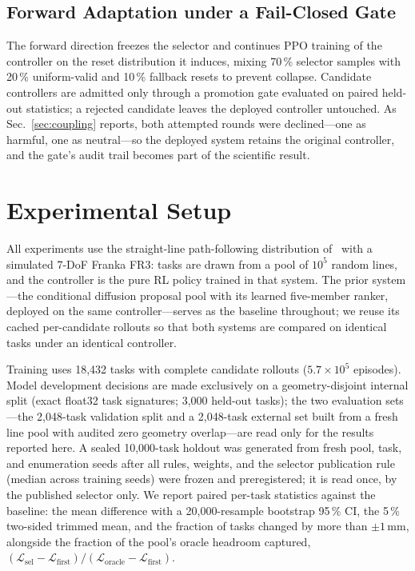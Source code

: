 \documentclass{svproc}
\begin{document}
\subsection{Forward Adaptation under a Fail-Closed Gate}
\label{sec:method-forward}
The forward direction freezes the selector and continues PPO training of the
controller on the reset distribution it induces, mixing 70\,\% selector
samples with 20\,\% uniform-valid and 10\,\% fallback resets to prevent
collapse. Candidate controllers are admitted only through a promotion gate
evaluated on paired held-out statistics; a rejected candidate leaves the
deployed controller untouched. As Sec.~\ref{sec:coupling} reports, both
attempted rounds were declined---one as harmful, one as neutral---so the
deployed system retains the original controller, and the gate's audit trail
becomes part of the scientific result.

\section{Experimental Setup}
\label{sec:setup}
All experiments use the straight-line path-following distribution
of~\cite{yuan2026extreme} with a simulated 7-DoF Franka FR3: tasks are drawn
from a pool of $10^{5}$ random lines, and the controller is the pure RL
policy trained in that system. The prior system---the conditional diffusion
proposal pool with its learned five-member ranker, deployed on the same
controller---serves as the baseline throughout; we reuse its cached
per-candidate rollouts so that both systems are compared on identical tasks
under an identical controller.

Training uses 18{,}432 tasks with complete candidate rollouts
($5.7\times10^{5}$ episodes). Model development decisions are made
exclusively on a geometry-disjoint internal split (exact float32 task
signatures; 3{,}000 held-out tasks); the two evaluation sets---the 2{,}048-task
validation split and a 2{,}048-task external set built from a fresh line
pool with audited zero geometry overlap---are read only for the results
reported here. A sealed 10{,}000-task holdout was generated from fresh pool,
task, and enumeration seeds after all rules, weights, and the selector
publication rule (median across training seeds) were frozen and
preregistered; it is read once, by the published selector only. We report
paired per-task statistics against the baseline: the mean difference with a
20{,}000-resample bootstrap 95\,\% CI, the 5\,\% two-sided trimmed mean, and
the fraction of tasks changed by more than $\pm1$\,mm, alongside the fraction
of the pool's oracle headroom captured,
$(\mathcal{L}_{\mathrm{sel}}-\mathcal{L}_{\mathrm{first}})/
 (\mathcal{L}_{\mathrm{oracle}}-\mathcal{L}_{\mathrm{first}})$.
\end{document}
